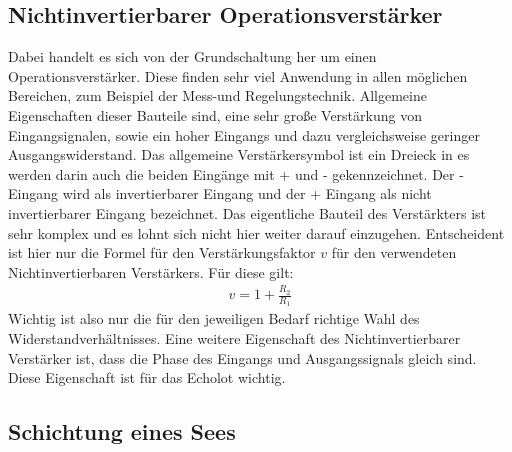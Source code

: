 \documentclass[12pt,a4paper,titlepage,headinclude,bibtotoc]{scrartcl}
\begin{document}
\subsection{Nichtinvertierbarer Operationsverstärker}
\label{sec:teoverstaerker}
Dabei handelt es sich von der Grundschaltung her um einen Operationsverstärker.
Diese finden sehr viel Anwendung in allen möglichen Bereichen, zum Beispiel der Mess-und Regelungstechnik. 
Allgemeine Eigenschaften dieser Bauteile sind, eine sehr große Verstärkung von Eingangsignalen, sowie ein hoher Eingangs und dazu vergleichsweise geringer Ausgangswiderstand.
Das allgemeine Verstärkersymbol ist ein Dreieck in es werden darin auch die beiden
Eingänge mit + und - gekennzeichnet.
Der - Eingang wird als invertierbarer Eingang und 
der + Eingang als nicht invertierbarer Eingang bezeichnet.
Das eigentliche Bauteil des Verstärkters ist sehr komplex und es lohnt sich nicht hier 
weiter darauf einzugehen.
Entscheident ist hier nur die Formel für den Verstärkungsfaktor $v$ für den verwendeten 
Nichtinvertierbaren Verstärkers. Für diese gilt:
\begin{align}
 v = 1 + \frac{R_2}{R_1}\label{eq:verst}
\end{align}
Wichtig ist also nur die für den jeweiligen Bedarf richtige Wahl des Widerstandverhältnisses.
Eine weitere Eigenschaft des Nichtinvertierbarer Verstärker ist, dass die Phase des Eingangs
und Ausgangssignals gleich sind. Diese Eigenschaft ist für das Echolot wichtig.


\subsection{Schichtung eines Sees}
\end{document}
